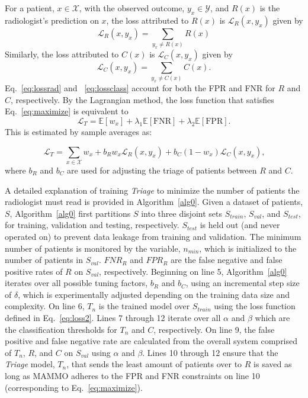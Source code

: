 \documentclass[journal]{IEEEtran}
\begin{document}
For a patient, $x \in \mathcal{X}$, with the observed outcome, $y_x \in \mathcal{Y}$, and $R(x)$ is the radiologist's prediction on $x$, the loss attributed to $R(x)$ is $\mathcal{L}_{R}(x, y_x)$ given by 
\begin{equation} \label{eq:lossrad}
   \mathcal{L}_{R}(x, y_x) = \sum_{y_x \neq R(x)}{R(x)}
\end{equation}  
Similarly, the loss attributed to $C(x)$ is $\mathcal{L}_{C}(x, y_x)$ given by
\begin{equation} \label{eq:lossclass}
   \mathcal{L}_{C}(x, y_x) = \sum_{y_x \neq C(x)}{C(x)}.
\end{equation} 
Eq.~\ref{eq:lossrad} and ~\ref{eq:lossclass} account for both the FPR and FNR for $R$ and $C$, respectively.  By the Lagrangian method, the loss function that satisfies Eq.~\ref{eq:maximize} is equivalent to
\begin{equation} \label{eq:loss1}
    \mathcal{L}_{T} = \mathbb{E}[w_x] + \lambda_1 \mathbb{E}[\text{FNR}] + \lambda_2\mathbb{E}[\text{FPR}]\textit{.}
\end{equation}
This is estimated by sample averages as:

\begin{equation} \label{eq:loss2}
    \mathcal{L}_{T} = \sum_{x \in \mathcal{X}}{w_x + b_R w_x\mathcal{L}_{R}(x, y_x) + b_C(1 - w_x)\mathcal{L}_{C}(x, y_x)}\textit{,}
\end{equation}
where $b_R$ and $b_C$ are used for adjusting the triage of patients between $R$ and $C$.  

A detailed explanation of training \textit{Triage} to minimize the number of patients the radiologist must read is provided in Algorithm~\ref{alg0}.  Given a dataset of patients, $S$, Algorithm~\ref{alg0} first partitions $S$ into three disjoint sets $S_{train}$, $S_{val}$, and $S_{test}$, for training, validation and testing, respectively.  $S_{test}$ is held out (and never operated on) to prevent data leakage from training and validation. The minimum number of patients is monitored by the variable, $n_{min}$, which is initialized to the number of patients in $S_{val}$.  $FNR_{R}$ and $FPR_{R}$ are the false negative and false positive rates of $R$ on $S_{val}$, respectively.  Beginning on line 5, Algorithm~\ref{alg0} iterates over all possible tuning factors, $b_R$ and  $b_C$, using an incremental step size of $\delta$, which is experimentally adjusted depending on the training data size and complexity.   On line 6, $T_n$ is the trained model over $S_{train}$ using the loss function defined in Eq.~\ref{eq:loss2}. Lines 7 through 12 iterate over all $\alpha$ and $\beta$ which are the classification thresholds for $T_n$ and $C$, respectively.  On line 9, the false positive and false negative rate are calculated from the overall system comprised of $T_n$, $R$, and $C$ on $S_{val}$ using $\alpha$ and $\beta$.  Lines 10 through 12 ensure that the \textit{Triage} model, $T_n$, that sends the least amount of patients over to $R$ is saved as long as MAMMO adheres to the FPR and FNR constraints on line 10 (corresponding to Eq.~\ref{eq:maximize}). 
\end{document}
